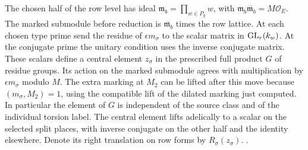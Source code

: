 The chosen half of the row level has ideal
\(\mathfrak m_b=\prod_{w\in P_g}w\), with
\(\mathfrak m_b\overline{\mathfrak m_b}=M\mathcal O_E\).
The marked submodule before reduction is
\(\overline{\mathfrak m_b}\) times the row lattice.
At each chosen type prime send the residue of
\(\epsilon m_\sigma\) to the scalar matrix in
\({\rm GL}_r(k_w)\). At the conjugate prime the unitary
condition uses the inverse conjugate matrix.
These scalars define a central element \(z_\sigma\) in
the prescribed full product \(G\) of residue groups.
Its action on the marked submodule agrees with
multiplication by \(\epsilon m_\sigma\) modulo \(M\).
The extra marking at \(M_2\) can be lifted after this
move because \((m_\sigma,M_2)=1\), using the compatible
lift of the dilated marking just computed. In particular
the element of \(G\) is independent of the source class
and of the individual torsion label. The central element
lifts adelically to a scalar on the selected split
places, with inverse conjugate on the other half and
the identity elsewhere. Denote its right translation
on row forms by \(R_\sigma(z_\sigma)\).
.


